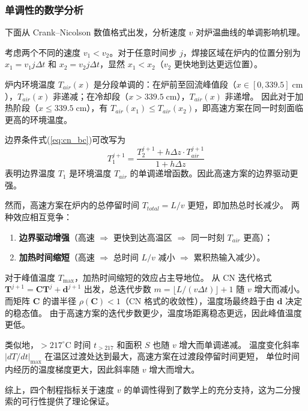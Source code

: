 \documentclass[12pt,a4paper]{ctexart}
\begin{document}
\subsubsection{单调性的数学分析}

下面从 Crank--Nicolson 数值格式出发，分析速度 $v$ 对炉温曲线的单调影响机理。

考虑两个不同的速度 $v_1 < v_2$。对于任意时间步 $j$，焊接区域在炉内的位置分别为 $x_1 = v_1 j\Delta t$ 和 $x_2 = v_2 j\Delta t$，显然 $x_1 < x_2$（$v_2$ 更快地到达更远位置）。

炉内环境温度 $T_{air}(x)$ 是分段单调的：在炉前至回流峰值段（$x \in [0, 339.5]\;\mathrm{cm}$），$T_{air}(x)$ 非递减；在冷却段（$x > 339.5\;\mathrm{cm}$），$T_{air}(x)$ 非递增。
因此对于加热阶段（$x \leq 339.5\;\mathrm{cm}$），有 $T_{air}(x_1) \leq T_{air}(x_2)$，即高速方案在同一时刻面临更高的环境温度。

边界条件式(\ref{eq:cn_bc})可改写为
\begin{equation}
T_1^{j+1} = \frac{T_2^{j+1} + h\Delta z \cdot T_{air}^{j+1}}{1 + h\Delta z}
\end{equation}
表明边界温度 $T_1$ 是环境温度 $T_{air}$ 的单调递增函数。因此高速方案的边界驱动更强。

然而，高速方案在炉内的总停留时间 $T_{total} = L/v$ 更短，即加热总时长减少。
两种效应相互竞争：
\begin{enumerate}[nosep]
    \item \textbf{边界驱动增强}（高速 $\Rightarrow$ 更快到达高温区 $\Rightarrow$ 同一时刻 $T_{air}$ 更高）；
    \item \textbf{加热时间缩短}（高速 $\Rightarrow$ 总时间 $L/v$ 减小 $\Rightarrow$ 累积热输入减少）。
\end{enumerate}

对于峰值温度 $T_{\max}$，加热时间缩短的效应占主导地位。
从 CN 迭代格式 $\mathbf{T}^{j+1} = \mathbf{C}\mathbf{T}^{j} + \mathbf{d}^{j+1}$ 出发，总迭代步数 $m = \lfloor L/(v\Delta t) \rfloor + 1$ 随 $v$ 增大而减小。
而矩阵 $\mathbf{C}$ 的谱半径 $\rho(\mathbf{C}) < 1$（CN 格式的收敛性），温度场最终趋于由 $\mathbf{d}$ 决定的稳态值。
由于高速方案的迭代步数更少，温度场距离稳态更远，因此峰值温度更低。

类似地，$>\!217^{\circ}\mathrm{C}$ 时间 $t_{>217}$ 和面积 $S$ 也随 $v$ 增大而单调递减。
温度变化斜率 $|dT/dt|_{\max}$ 在温区过渡处达到最大，高速方案在过渡段停留时间更短，
单位时间内经历的温度梯度更大，因此斜率随 $v$ 增大而增大。

综上，四个制程指标关于速度 $v$ 的单调性得到了数学上的充分支持，这为二分搜索的可行性提供了理论保证。
\end{document}
